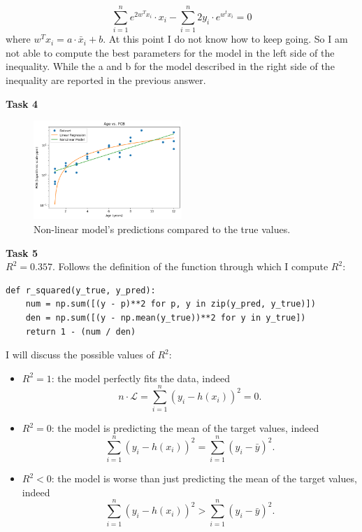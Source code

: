 \documentclass[a4paper,12pt]{article}
\begin{document}
\begin{equation}
	\sum_{i=1}^{n} e^{2w^Tx_i} \cdot x_i - \sum_{i=1}^{n} 2y_i \cdot e^{w^t x_i} = 0
\end{equation}
where $w^Tx_i = a \cdot \bar{x}_i + b$. At this point I do not know how to keep
going. So I am not able to compute the best parameters for the model in the left
side of the inequality. While the a and b for the model described in the right
side of the inequality are reported in the previous answer.

\vspace{1em}
\noindent\textbf{Task 4}\\
\begin{figure}[htbp]
	\centering
	\includegraphics[width=0.5\textwidth]{a2-t4}
	\caption{Non-linear model's predictions compared to the true values.}
\end{figure}

\vspace{1em}
\noindent\textbf{Task 5}\\
$R^2 = 0.357$. Follows the definition of the function through which I compute
$R^2$:

\begin{lstlisting}
def r_squared(y_true, y_pred):
    num = np.sum([(y - p)**2 for p, y in zip(y_pred, y_true)])
    den = np.sum([(y - np.mean(y_true))**2 for y in y_true])
    return 1 - (num / den)
\end{lstlisting}

I will discuss the possible values of $R^2$:
\begin{itemize}
	\item $R^2 = 1$: the model perfectly fits the data, indeed
	      \begin{equation}
		      n \cdot \mathcal{L} = \sum_{i=1}^{n} (y_i - h(x_i))^2 = 0.
	      \end{equation}

	\item $R^2 = 0$: the model is predicting the mean of the target values,
	      indeed
	      \begin{equation}
		      \sum_{i=1}^{n} (y_i - h(x_i))^2 = \sum_{i=1}^{n} (y_i - \bar{y})^2.
	      \end{equation}

	\item $R^2 < 0$: the model is worse than just predicting the mean of the
	      target values, indeed
	      \begin{equation}
		      \sum_{i=1}^{n} (y_i - h(x_i))^2 > \sum_{i=1}^{n} (y_i - \bar{y})^2.
	      \end{equation}
\end{itemize}
\end{document}
